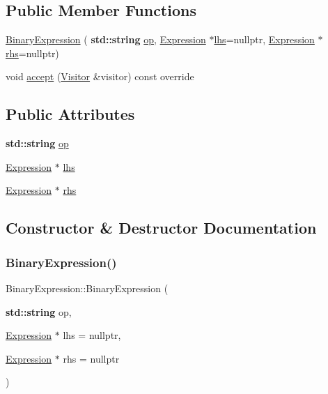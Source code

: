\subsection*{Public Member Functions}
\begin{DoxyCompactItemize}
\item 
\hyperlink{struct_binary_expression_a6fb4760b068f658a3b65271ab5f46b73}{Binary\+Expression} (\textbf{ std\+::string} \hyperlink{struct_binary_expression_a4c33b66e2ffc0a5ede2cdd190bf4bd75}{op}, \hyperlink{struct_expression}{Expression} $\ast$\hyperlink{struct_binary_expression_ae689284a646929c99e634e75f50cb32c}{lhs}=nullptr, \hyperlink{struct_expression}{Expression} $\ast$\hyperlink{struct_binary_expression_ad569ae3b07f428257b0e7a96746ceb32}{rhs}=nullptr)
\item 
void \hyperlink{struct_binary_expression_af8318bd8b21b4bbca064e8a6086a10a0}{accept} (\hyperlink{struct_visitor}{Visitor} \&visitor) const override
\end{DoxyCompactItemize}
\subsection*{Public Attributes}
\begin{DoxyCompactItemize}
\item 
\textbf{ std\+::string} \hyperlink{struct_binary_expression_a4c33b66e2ffc0a5ede2cdd190bf4bd75}{op}
\item 
\hyperlink{struct_expression}{Expression} $\ast$ \hyperlink{struct_binary_expression_ae689284a646929c99e634e75f50cb32c}{lhs}
\item 
\hyperlink{struct_expression}{Expression} $\ast$ \hyperlink{struct_binary_expression_ad569ae3b07f428257b0e7a96746ceb32}{rhs}
\end{DoxyCompactItemize}


\subsection{Constructor \& Destructor Documentation}
\mbox{\label{struct_binary_expression_a6fb4760b068f658a3b65271ab5f46b73}} 
\subsubsection{\texorpdfstring{Binary\+Expression()}{BinaryExpression()}}
{\footnotesize\ttfamily Binary\+Expression\+::\+Binary\+Expression (\begin{DoxyParamCaption}\item[{\textbf{ std\+::string}}]{op,  }\item[{\hyperlink{struct_expression}{Expression} $\ast$}]{lhs = {\ttfamily nullptr},  }\item[{\hyperlink{struct_expression}{Expression} $\ast$}]{rhs = {\ttfamily nullptr} }\end{DoxyParamCaption})\hspace{0.3cm}{\ttfamily [inline]}}



